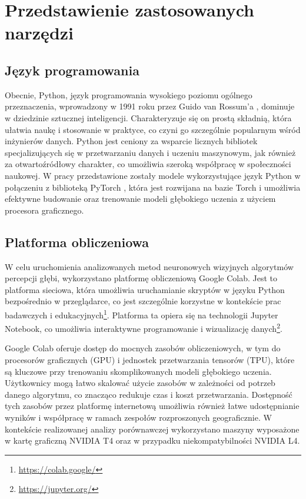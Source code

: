 \chapter{Przedstawienie zastosowanych narzędzi}\label{chap:przedstawienie_zastosowanych_narzędzi}

\section{Język programowania}
Obecnie, Python, język programowania wysokiego poziomu ogólnego przeznaczenia, wprowadzony w 1991 roku przez Guido van Rossum’a \cite{Python}, dominuje w dziedzinie sztucznej inteligencji. Charakteryzuje się on prostą składnią, która ułatwia naukę i stosowanie w praktyce, co czyni go szczególnie popularnym wśród inżynierów danych. Python jest ceniony za wsparcie licznych bibliotek specjalizujących się w przetwarzaniu danych i uczeniu maszynowym, jak również za otwartoźródłowy charakter, co umożliwia szeroką współpracę w społeczności naukowej. W pracy przedstawione zostały modele wykorzystujące język Python w połączeniu z biblioteką PyTorch \cite{paszke2019}, która jest rozwijana na bazie Torch i umożliwia efektywne budowanie oraz trenowanie modeli głębokiego uczenia z użyciem procesora graficznego.

\section{Platforma obliczeniowa}
W celu uruchomienia analizowanych metod neuronowych wizyjnych algorytmów percepcji głębi, wykorzystano platformę obliczeniową Google Colab. Jest to platforma sieciowa, która umożliwia uruchamianie skryptów w języku Python bezpośrednio w przeglądarce, co jest szczególnie korzystne w kontekście prac badawczych i edukacyjnych\footnote{\href{https://colab.google/}{https://colab.google/}}. Platforma ta opiera się na technologii Jupyter Notebook, co umożliwia interaktywne programowanie i wizualizację danych\footnote{\href{https://jupyter.org/}{https://jupyter.org/}}.

Google Colab oferuje dostęp do mocnych zasobów obliczeniowych, w tym do procesorów graficznych (GPU) i jednostek przetwarzania tensorów (TPU), które są kluczowe przy trenowaniu skomplikowanych modeli głębokiego uczenia. Użytkownicy mogą łatwo skalować użycie zasobów w zależności od potrzeb danego algorytmu, co znacząco redukuje czas i koszt przetwarzania. Dostępność tych zasobów przez platformę internetową umożliwia również łatwe udostępnianie wyników i współpracę w ramach zespołów rozproszonych geograficznie. W kontekście realizowanej analizy porównawczej wykorzystano maszyny wyposażone w kartę graficzną NVIDIA T4 oraz w przypadku niekompatybilności NVIDIA L4.

